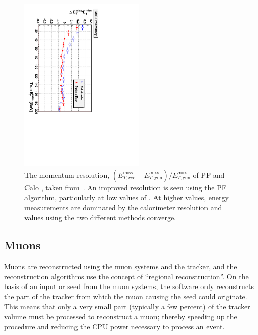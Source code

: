 \begin{figure}[htbp]
  \begin{center}
  \includegraphics[width=0.53\textwidth, angle =90]{Figures/detector/METresPF.pdf}
  \caption{The momentum resolution, $(E^{\mathrm{miss}}_{T,rec} - E^{\mathrm{miss}}_{T,\mathrm{gen}})/E^{\mathrm{miss}}_{T,\mathrm{gen}}$ of \ac{PF} and Calo \MET, taken from~\cite{PFT-09-001}. An improved resolution is seen using the \ac{PF} algorithm, particularly at low values of \MET. At higher \MET values, energy measurements are dominated by the calorimeter resolution and values using the two different methods converge.}
  \label{fig:PFMET}
  \end{center}
\end{figure}

\subsection{Muons}

Muons are reconstructed using the muon systems and the tracker, and the reconstruction algorithms use the concept of ``regional reconstruction''. 
On the basis of an input or seed from the muon systems, the software only reconstructs the part of the tracker from which the muon causing the seed could originate.
This means that only a very small part (typically a few percent) of the tracker volume must be processed to reconstruct a muon; thereby speeding up the procedure and reducing the CPU power necessary to process an event.

